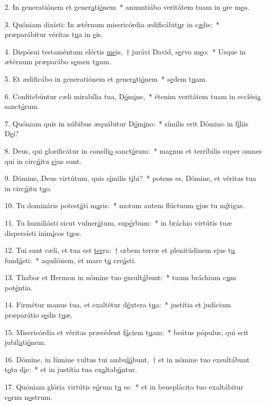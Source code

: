 2. In generatiónem et gener\uline{a}ti\uline{ó}nem~* annuntiábo veritátem tuam in \uline{o}re m\uline{e}o.\par 
3. Quóniam dixísti: In ætérnum misericórdia ædificábit\uline{u}r in c\uline{æ}lis:~* præparábitur véritas t\uline{u}a in \uline{e}is.\par 
4. Dispósui testaméntum eléctis \uline{me}is,~† jurávi David, s\uline{e}rvo m\uline{e}o:~* Usque in ætérnum præparábo s\uline{e}men t\uline{u}um.\par 
5. Et ædificábo in generatiónem et gener\uline{a}ti\uline{ó}nem~* s\uline{e}dem t\uline{u}am.\par 
6. Confitebúntur cæli mirabília tua, D\uline{ó}m\uline{i}ne,~* étenim veritátem tuam in ecclési\uline{a} sanct\uline{ó}rum.\par 
7. Quóniam quis in núbibus æquábitur D\uline{ó}m\uline{i}no:~* símilis erit Dómino in f\uline{í}liis D\uline{e}i?\par 
8. Deus, qui glorificátur in consíli\uline{o} sanct\uline{ó}rum:~* magnus et terríbilis super omnes qui in circ\uline{ú}itu \uline{e}jus sunt.\par 
9. Dómine, Deus virtútum, quis s\uline{í}milis t\uline{i}bi?~* potens es, Dómine, et véritas tua in circ\uline{ú}itu t\uline{u}o.\par 
10. Tu domináris potest\uline{á}ti m\uline{a}ris:~* motum autem flúctuum \uline{e}jus tu m\uline{í}tigas.\par 
11. Tu humiliásti sicut vulner\uline{á}tum, sup\uline{é}rbum:~* in bráchio virtútis tuæ dispersísti inim\uline{í}cos t\uline{u}os.\par 
12. Tui sunt cæli, et tua est \uline{ter}ra:~† orbem terræ et plenitúdinem ejus t\uline{u} fund\uline{á}sti:~* aquilónem, et mare t\uline{u} cre\uline{á}sti.\par 
13. Thabor et Hermon in nómine tuo \uline{e}xsult\uline{á}bunt:~* tuum bráchium c\uline{u}m pot\uline{é}ntia.\par 
14. Firmétur manus tua, et exaltétur d\uline{é}xtera t\uline{u}a:~* justítia et judícium præparátio s\uline{e}dis t\uline{u}æ.\par 
15. Misericórdia et véritas præcédent f\uline{á}ciem t\uline{u}am:~* beátus pópulus, qui scit jubil\uline{a}ti\uline{ó}nem.\par 
16. Dómine, in lúmine vultus tui ambu\uline{lá}bunt,~† et in nómine tuo exsultábunt t\uline{o}ta d\uline{i}e:~* et in justítia tua ex\uline{a}ltab\uline{ú}ntur.\par 
17. Quóniam glória virtútis e\uline{ó}rum t\uline{u} es:~* et in beneplácito tuo exaltábitur c\uline{o}rnu n\uline{o}strum.\par 
